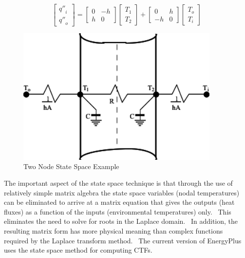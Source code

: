 \begin{equation}
\left[ {\begin{array}{*{20}{c}}{{{q''}_i}}\\ {{{q''}_o}}\end{array}} \right] = \left[ {\begin{array}{*{20}{c}}0&{ - h}\\h&0\end{array}} \right]\left[ {\begin{array}{*{20}{c}}{{T_1}}\\ {{T_2}}\end{array}} \right] + \left[ {\begin{array}{*{20}{c}}0&h\\ { - h}&0\end{array}} \right]\left[ {\begin{array}{*{20}{c}}{{T_o}}\\ {{T_i}}\end{array}} \right]
\end{equation}

\begin{figure}[hbtp] %
\centering
\includegraphics[width=0.9\textwidth, height=0.9\textheight, keepaspectratio=true]{media/image6008.svg.png}
\caption{Two Node State Space Example \protect \label{fig:two-node-state-space-example}}
\end{figure}

The important aspect of the state space technique is that through the use of relatively simple matrix algebra the state space variables (nodal temperatures) can be eliminated to arrive at a matrix equation that gives the outputs (heat fluxes) as a function of the inputs (environmental temperatures) only.~ This eliminates the need to solve for roots in the Laplace domain.~ In addition, the resulting matrix form has more physical meaning than complex functions required by the Laplace transform method.~ The current version of EnergyPlus uses the state space method for computing CTFs.

